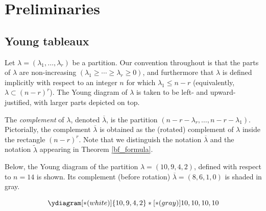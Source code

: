 \section{Preliminaries}\label{conventions}

\subsection{Young tableaux}\label{yt_section}

Let $\lambda=(\lambda_1,\ldots,\lambda_r)$ be a partition. Our convention throughout is that the parts of $\lambda$ are non-increasing $(\lambda_1\ge\cdots\ge\lambda_r\ge0)$, and furthermore that $\lambda$ is defined implicitly with respect to an integer $n$ for which $\lambda_1\le n-r$ (equivalently, $\lambda\subset(n-r)^r$). The Young diagram of $\lambda$ is taken to be left- and upward-justified, with larger parts depicted on top. 

The \emph{complement} of $\lambda$, denoted $\overline{\lambda}$, is the partition $(n-r-\lambda_r,\ldots,n-r-\lambda_1)$. Pictorially, the complement $\overline{\lambda}$ is obtained as the (rotated) complement of $\lambda$ inside the rectangle $(n-r)^r$. Note that we distinguish the notation $\overline{\lambda}$ and the notation $\widetilde{\lambda}$ appearing in Theorem \ref{bf_formula}.

Below, the Young diagram of the partition $\lambda=(10,9,4,2)$, defined with respect to $n=14$ is shown. Its complement (before rotation) $\overline{\lambda}=(8,6,1,0)$ is shaded in gray.

\begin{equation*}
\ydiagram[*(white) ]
{10,9,4,2}
*[*(gray)]{10,10,10,10}
\end{equation*}

